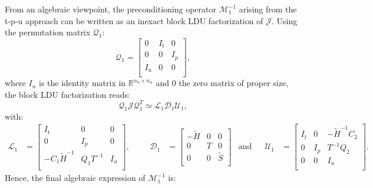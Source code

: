 \documentclass[3p,times]{elsarticle}
\theoremstyle{plain}
\newcommand{\Mat}[1]{#1}
\newcommand{\tS}{\widetilde{S}}
\newcommand{\tH}{\widetilde{H}}
\begin{document}
From an algebraic viewpoint, the preconditioning operator $\mathcal{M}_1^{-1}$ arising from the t-p-u approach can be written as an inexact block LDU factorization of $\mathcal{J}$. 
Using the permutation matrix $\mathcal{Q}_1$:
\begin{equation}
  \mathcal{Q}_1 = \begin{bmatrix}
    \Mat{0} & \Mat{I}_t & \Mat{0} \\
    \Mat{0} & \Mat{0} & \Mat{I}_p \\
    \Mat{I}_u & \Mat{0} & \Mat{0} \\
  \end{bmatrix},
  \label{eq:Q1}
\end{equation}
where $\Mat{I}_n$ is the identity matrix in $\mathbb{R}^{n_n\times n_n}$ and $\Mat{0}$ the zero matrix of proper size,
the block LDU factorization reads:
\begin{equation}
  \mathcal{Q}_1 \mathcal{J} \mathcal{Q}_1^T \simeq \mathcal{L}_1 \mathcal{D}_1 \mathcal{U}_1,
\end{equation}
with:
\begin{align}
  \mathcal{L}_1 &= \begin{bmatrix}
    \Mat{I}_t & \Mat{0} & \Mat{0} \\
    \Mat{0} & \Mat{I}_p & \Mat{0} \\
    -\Mat{C}_1\Mat{\tH}^{-1} & \Mat{Q}_1\Mat{T}^{-1} & \Mat{I}_u \\
  \end{bmatrix}, &&&
  \mathcal{D}_1 &= \begin{bmatrix}
    -\Mat{\tH} & \Mat{0} & \Mat{0} \\
    \Mat{0} & \Mat{T} & \Mat{0} \\
    \Mat{0} & \Mat{0} & \Mat{\tS} \\
  \end{bmatrix} & \text{and} &&
  \mathcal{U}_1 &= \begin{bmatrix}
    \Mat{I}_t & \Mat{0} & -\Mat{\tH}^{-1}\Mat{C}_2 \\
    \Mat{0} & \Mat{I}_p & \Mat{T}^{-1}\Mat{Q}_2 \\
    \Mat{0} & \Mat{0} & \Mat{I}_u \\
  \end{bmatrix}.
  \label{eq:LDU1}
\end{align}
Hence, the final algebraic expression of $\mathcal{M}_1^{-1}$ is:
\end{document}
